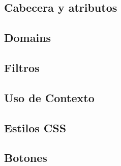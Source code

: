 \documentclass[letterpaper,10pt,spanish]{sphinxmanual}
\begin{document}
\subsection{Cabecera y atributos}
\label{\detokenize{tecnico/vistas/estructura-y-sintaxis/cabecera-y-atributos:cabecera-y-atributos}}\label{\detokenize{tecnico/vistas/estructura-y-sintaxis/cabecera-y-atributos:id1}}\label{\detokenize{tecnico/vistas/estructura-y-sintaxis/cabecera-y-atributos::doc}}

\subsection{Domains}
\label{\detokenize{tecnico/vistas/estructura-y-sintaxis/domains:domains}}\label{\detokenize{tecnico/vistas/estructura-y-sintaxis/domains:id1}}\label{\detokenize{tecnico/vistas/estructura-y-sintaxis/domains::doc}}

\subsection{Filtros}
\label{\detokenize{tecnico/vistas/estructura-y-sintaxis/filtros:filtros}}\label{\detokenize{tecnico/vistas/estructura-y-sintaxis/filtros:id1}}\label{\detokenize{tecnico/vistas/estructura-y-sintaxis/filtros::doc}}

\subsection{Uso de Contexto}
\label{\detokenize{tecnico/vistas/estructura-y-sintaxis/uso-de-contexto:uso-de-contexto}}\label{\detokenize{tecnico/vistas/estructura-y-sintaxis/uso-de-contexto:id1}}\label{\detokenize{tecnico/vistas/estructura-y-sintaxis/uso-de-contexto::doc}}

\subsection{Estilos CSS}
\label{\detokenize{tecnico/vistas/estructura-y-sintaxis/estilos-css:estilos-css}}\label{\detokenize{tecnico/vistas/estructura-y-sintaxis/estilos-css:id1}}\label{\detokenize{tecnico/vistas/estructura-y-sintaxis/estilos-css::doc}}

\subsection{Botones}
\label{\detokenize{tecnico/vistas/estructura-y-sintaxis/botones:botones}}\label{\detokenize{tecnico/vistas/estructura-y-sintaxis/botones:id1}}\label{\detokenize{tecnico/vistas/estructura-y-sintaxis/botones::doc}}
\end{document}
